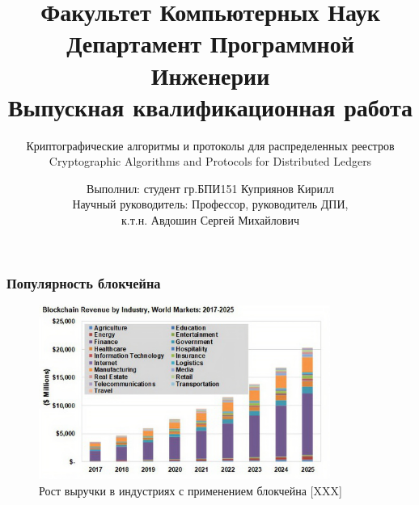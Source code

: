 \documentclass{beamer}
\title[Заголовок]{\footnotesize Факультет Компьютерных Наук\\Департамент
Программной Инженерии\\Выпускная квалификационная работа}
\subtitle{Криптографические алгоритмы и протоколы для распределенных реестров\\
Cryptographic Algorithms and Protocols for Distributed Ledgers}
\author[Куприянов К.И.]{\scriptsize Выполнил: студент
гр.БПИ151 Куприянов Кирилл\\Научный руководитель: Профессор, руководитель ДПИ,\\к.т.н. Авдошин Сергей Михайлович}
\institute[Высшая школа экономики]{}
\date{\the\year}
\begin{document}
\frame[plain]{
    \maketitle
}



\begin{frame}
\frametitle{Популярность блокчейна}
    \begin{figure}
        \includegraphics[width=0.85\textwidth]{graph}
        \caption{\small Рост выручки в индустриях с применением блокчейна [XXX]}
    \end{figure}


\end{frame}
\end{document}

